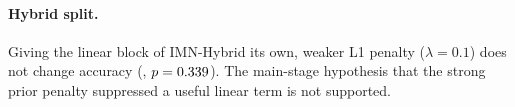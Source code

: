 \paragraph{Hybrid split.} Giving the linear block of IMN-Hybrid its own, weaker L1 penalty
($\lambda=0.1$) does not change accuracy (\AblSplitMean, $p=0.339$). The main-stage
hypothesis that the strong prior penalty suppressed a useful linear term is not supported.

\begin{table}[h]\centering\small
\caption{Ablations (Tier 1, seeds 0--2). $\Delta$ is the test AUROC change versus the reference
arm on the same seeds; $p$ is an uncorrected two-sided Wilcoxon test over datasets. The last
column is local fidelity at $k=10$.}\label{tab:abl}
\end{table}
